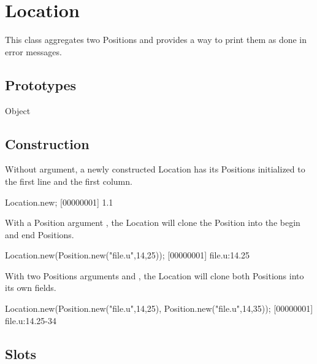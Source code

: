 \section{Location}

This class aggregates two Positions and provides a way to print them as done
in error messages.

\subsection{Prototypes}
\begin{refObjects}
\item[Object]
\end{refObjects}

\subsection{Construction}

Without argument, a newly constructed Location has its Positions initialized
to the first line and the first column.

\begin{urbiscript}[firstnumber=1]
Location.new;
[00000001] 1.1
\end{urbiscript}

With a Position argument , the Location will clone the Position into
the begin and end Positions.

\begin{urbiscript}[firstnumber=1]
Location.new(Position.new("file.u",14,25));
[00000001] file.u:14.25
\end{urbiscript}

With two Positions arguments  and , the Location will
clone both Positions into its own fields.

\begin{urbiscript}[firstnumber=1]
Location.new(Position.new("file.u",14,25), Position.new("file.u",14,35));
[00000001] file.u:14.25-34
\end{urbiscript}

\subsection{Slots}


